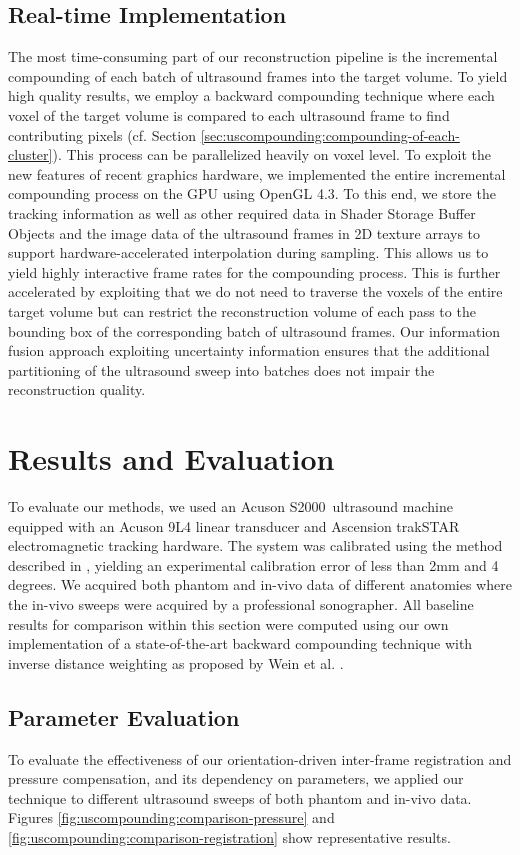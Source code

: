 \subsection{Real-time Implementation}
The most time-consuming part of our reconstruction pipeline is the incremental compounding of each batch of ultrasound frames into the target volume.
To yield high quality results, we employ a backward compounding technique where each voxel of the target volume is compared to each ultrasound frame to find contributing pixels (cf. Section \ref{sec:uscompounding:compounding-of-each-cluster}).
This process can be parallelized heavily on voxel level.
To exploit the new features of recent graphics hardware, we implemented the entire incremental compounding process on the GPU using OpenGL 4.3.
To this end, we store the tracking information as well as other required data in Shader Storage Buffer Objects \cite{OpenGL43,SSBO} and the image data of the ultrasound frames in 2D texture arrays to support hardware-accelerated interpolation during sampling.
This allows us to yield highly interactive frame rates for the compounding process.
This is further accelerated by exploiting that we do not need to traverse the voxels of the entire target volume but can restrict the reconstruction volume of each pass to the bounding box of the corresponding batch of ultrasound frames.
Our information fusion approach exploiting uncertainty information ensures that the additional partitioning of the ultrasound sweep into batches does not impair the reconstruction quality.


\section{Results and Evaluation}
To evaluate our methods, we used an Acuson S2000\texttrademark~ultrasound machine equipped with an Acuson 9L4 linear transducer and Ascension trakSTAR electromagnetic tracking hardware.
The system was calibrated using the method described in \cite{Wein08}, yielding an experimental calibration error of less than 2mm and 4 degrees.
We acquired both phantom and in-vivo data of different anatomies where the in-vivo sweeps were acquired by a professional sonographer.
All baseline results for comparison within this section were computed using our own implementation of a state-of-the-art backward compounding technique with inverse distance weighting as proposed by Wein et al. \cite{Wein06}.


\subsection{Parameter Evaluation}
To evaluate the effectiveness of our orientation-driven inter-frame registration and pressure compensation, and its dependency on parameters, we applied our technique to different ultrasound sweeps of both phantom and in-vivo data.
Figures \ref{fig:uscompounding:comparison-pressure} and \ref{fig:uscompounding:comparison-registration} show representative results.

